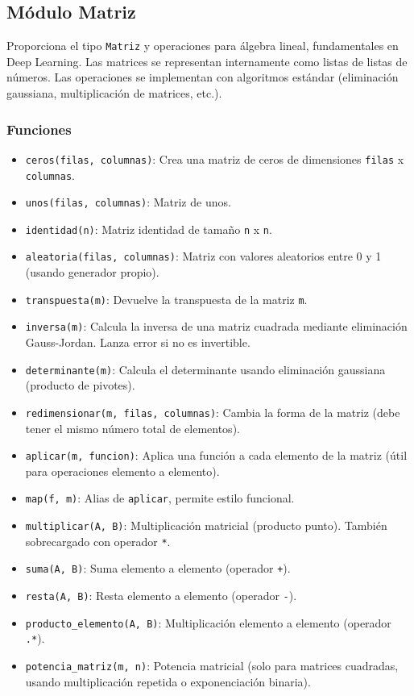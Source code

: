 \documentclass[12pt]{article}
\begin{document}
\subsection{Módulo Matriz}

Proporciona el tipo \texttt{Matriz} y operaciones para álgebra lineal, fundamentales en Deep Learning. Las matrices se representan internamente como listas de listas de números. Las operaciones se implementan con algoritmos estándar (eliminación gaussiana, multiplicación de matrices, etc.).

\subsubsection*{Funciones}
\begin{itemize}
    \item \texttt{ceros(filas, columnas)}: Crea una matriz de ceros de dimensiones \texttt{filas} x \texttt{columnas}.
    \item \texttt{unos(filas, columnas)}: Matriz de unos.
    \item \texttt{identidad(n)}: Matriz identidad de tamaño \texttt{n} x \texttt{n}.
    \item \texttt{aleatoria(filas, columnas)}: Matriz con valores aleatorios entre 0 y 1 (usando generador propio).
    \item \texttt{transpuesta(m)}: Devuelve la transpuesta de la matriz \texttt{m}.
    \item \texttt{inversa(m)}: Calcula la inversa de una matriz cuadrada mediante eliminación Gauss-Jordan. Lanza error si no es invertible.
    \item \texttt{determinante(m)}: Calcula el determinante usando eliminación gaussiana (producto de pivotes).
    \item \texttt{redimensionar(m, filas, columnas)}: Cambia la forma de la matriz (debe tener el mismo número total de elementos).
    \item \texttt{aplicar(m, funcion)}: Aplica una función a cada elemento de la matriz (útil para operaciones elemento a elemento).
    \item \texttt{map(f, m)}: Alias de \texttt{aplicar}, permite estilo funcional.
    \item \texttt{multiplicar(A, B)}: Multiplicación matricial (producto punto). También sobrecargado con operador \texttt{*}.
    \item \texttt{suma(A, B)}: Suma elemento a elemento (operador \texttt{+}).
    \item \texttt{resta(A, B)}: Resta elemento a elemento (operador \texttt{-}).
    \item \texttt{producto\_elemento(A, B)}: Multiplicación elemento a elemento (operador \texttt{.*}).
    \item \texttt{potencia\_matriz(m, n)}: Potencia matricial (solo para matrices cuadradas, usando multiplicación repetida o exponenciación binaria).
\end{itemize}
\end{document}

